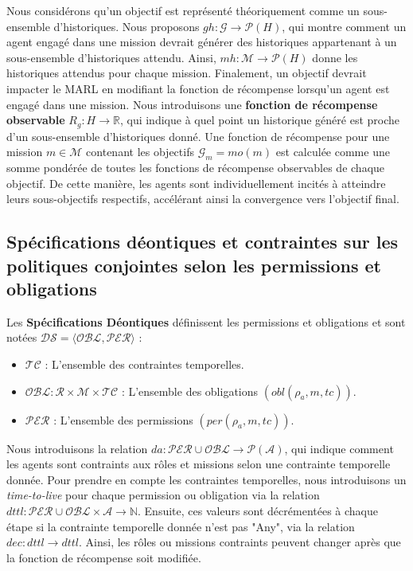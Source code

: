 \documentclass[sigconf,anonymous]{aamas}
\begin{document}
Nous considérons qu'un objectif est représenté théoriquement comme un sous-ensemble d'historiques. Nous proposons $gh: \mathcal{G} \rightarrow \mathcal{P}(H)$, qui montre comment un agent engagé dans une mission devrait générer des historiques appartenant à un sous-ensemble d'historiques attendu. Ainsi, $mh: \mathcal{M} \rightarrow \mathcal{P}(H)$ donne les historiques attendus pour chaque mission. Finalement, un objectif devrait impacter le MARL en modifiant la fonction de récompense lorsqu'un agent est engagé dans une mission. Nous introduisons une \textbf{fonction de récompense observable} $R_{g}: H \rightarrow \mathbb{R}$, qui indique à quel point un historique généré est proche d'un sous-ensemble d'historiques donné. Une fonction de récompense pour une mission $m \in \mathcal{M}$ contenant les objectifs $\mathcal{G}_{m} = mo(m)$ est calculée comme une somme pondérée de toutes les fonctions de récompense observables de chaque objectif. De cette manière, les agents sont individuellement incités à atteindre leurs sous-objectifs respectifs, accélérant ainsi la convergence vers l'objectif final.

\subsection{Spécifications déontiques et contraintes sur les politiques conjointes selon les permissions et obligations}

Les \textbf{Spécifications Déontiques} définissent les permissions et obligations et sont notées $\mathcal{DS} = \langle \mathcal{OBL}, \mathcal{PER} \rangle$ :

\begin{itemize}
    \item $\mathcal{TC}$ : L'ensemble des contraintes temporelles.
    \item $\mathcal{OBL}: \mathcal{R} \times \mathcal{M} \times \mathcal{TC}$ : L'ensemble des obligations $(obl(\rho_a, m, tc))$.
    \item $\mathcal{PER}$ : L'ensemble des permissions $(per(\rho_a, m, tc))$.
\end{itemize}

Nous introduisons la relation $da: \mathcal{PER} \cup \mathcal{OBL} \rightarrow \mathcal{P}(\mathcal{A})$, qui indique comment les agents sont contraints aux rôles et missions selon une contrainte temporelle donnée. Pour prendre en compte les contraintes temporelles, nous introduisons un \textit{time-to-live} pour chaque permission ou obligation via la relation $dttl: \mathcal{PER} \cup \mathcal{OBL} \times \mathcal{A} \rightarrow \mathbb{N}$. Ensuite, ces valeurs sont décrémentées à chaque étape si la contrainte temporelle donnée n'est pas "Any", via la relation $dec: dttl \rightarrow dttl$. Ainsi, les rôles ou missions contraints peuvent changer après que la fonction de récompense soit modifiée.
\end{document}
